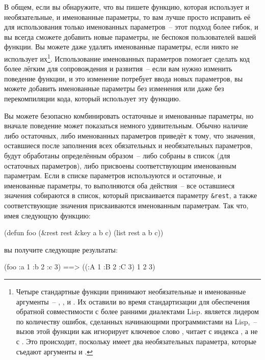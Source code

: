 В общем, если вы обнаружите, что вы пишете функцию, которая использует и необязательные, и
именованные параметры, то вам лучше просто исправить её для использования только
именованных параметров~-- этот подход более гибок, и вы всегда сможете добавить новые
параметры, не беспокоя пользователей вашей функции.  Вы можете даже удалять именованные
параметры, если никто не использует их\footnote{Четыре стандартные функции принимают
  необязательные и именованные аргументы~-- ,
  ,  и .  Их оставили во время
  стандартизации для обеспечения обратной совместимости с более ранними диалектами Lisp.
   является лидером по количеству ошибок, сделанных начинающими
  программистами на Lisp,~-- вызов этой функции как 
  игнорирует ключевое слово , читает с индекса , а не с .
  Это происходит, поскольку  имеет два необязательных параметра,
  которые съедают аргументы  и .}.  Использование именованных
параметров помогает сделать код более лёгким для сопровождения и развития~-- если вам
нужно изменить поведение функции, и это изменение потребует ввода новых параметров, вы
можете добавить именованные параметры без изменения или даже без перекомпиляции кода,
который использует эту функцию.

Вы можете безопасно комбинировать остаточные и именованные параметры, но вначале поведение
может показаться немного удивительным.  Обычно наличие либо остаточных, либо именованных
параметров приведёт к тому, что значения, оставшиеся после заполнения всех обязательных и
необязательных параметров, будут обработаны определённым образом~-- либо собраны в список
(для остаточных параметров), либо присвоены соответствующим именованным параметрам. Если в
списке параметров используются и остаточные, и именованные параметры, то выполняются оба
действия~-- все оставшиеся значения собираются в список, который присваивается параметру
\lstinline!&rest!, а также соответствующие значения присваиваются именованным параметрам.
Так что, имея следующую функцию:

\begin{myverb}
  (defun foo (&rest rest &key a b c) 
    (list rest a b c))
\end{myverb}

\noindent{}вы получите следующие результаты:

\begin{myverb}
  (foo :a 1 :b 2 :c 3)  ==> ((:A 1 :B 2 :C 3) 1 2 3)
\end{myverb}

